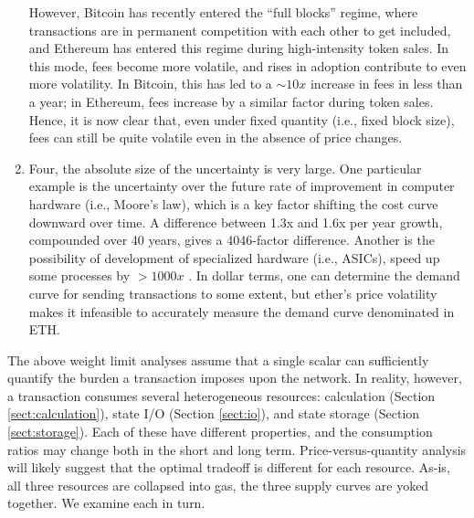 \documentclass[12pt, final]{article}
\begin{document}
\begin{enumerate}
However, Bitcoin has recently entered the ``full blocks'' regime, where transactions are in permanent competition with each other to get included, and Ethereum has entered this regime during high-intensity token sales\cite{braveICO}. In this mode, fees become more volatile, and rises in adoption contribute to even more volatility. In Bitcoin, this has led to a $\sim 10x$ increase in fees in less than a year; in Ethereum, fees increase by a similar factor during token sales. Hence, it is now clear that, even under fixed quantity (i.e., fixed block size), fees can still be quite volatile even in the absence of price changes.

\item Four, the absolute size of the uncertainty is very large. One particular example is the uncertainty over the future rate of improvement in computer hardware (i.e., Moore's law), which is a key factor shifting the cost curve downward over time. A difference between 1.3x and 1.6x per year growth, compounded over 40 years, gives a 4046-factor difference. Another is the possibility of development of specialized hardware (i.e., ASICs), speed up some processes by $>\!1000x$ . In dollar terms, one can determine the demand curve for sending transactions to some extent, but ether’s price volatility makes it infeasible to accurately measure the demand curve denominated in ETH.

\end{enumerate}



The above weight limit analyses assume that a single scalar can sufficiently quantify the burden a transaction imposes upon the network. In reality, however, a transaction consumes several heterogeneous resources: calculation (Section \ref{sect:calculation}), state I/O (Section \ref{sect:io}), and state storage (Section \ref{sect:storage}).  Each of these have different properties, and the consumption ratios may change both in the short and long term.  Price-versus-quantity analysis will likely suggest that the optimal tradeoff is different for each resource.  As-is, all three resources are collapsed into gas, the three supply curves are yoked together.  We examine each in turn.  
\end{document}
